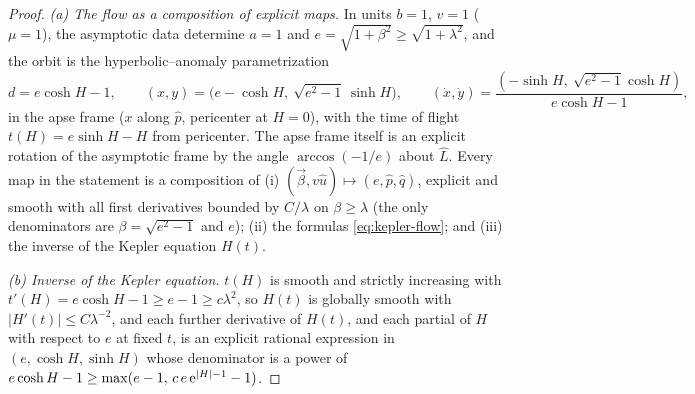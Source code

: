 \documentclass[11pt]{article}
\begin{document}
\begin{proof}
\emph{(a) The flow as a composition of explicit maps.} In units $b=1$, $v=1$ ($\mu=1$), the
asymptotic data determine $a=1$ and $e=\sqrt{1+\beta^2}\ge\sqrt{1+\lambda^2}$, and the orbit is
the hyperbolic--anomaly parametrization
\begin{equation}
  d=e\cosh H-1,\qquad
  (x,y)=\big(e-\cosh H,\ \sqrt{e^2-1}\,\sinh H\big),\qquad
  (\dot x,\dot y)=\frac{(-\sinh H,\ \sqrt{e^2-1}\cosh H)}{e\cosh H-1},
  \label{eq:kepler-flow}
\end{equation}
in the apse frame ($x$ along $\hat p$, pericenter at $H=0$), with the time of flight
$t(H)=e\sinh H-H$ from pericenter. The apse frame itself is an explicit rotation of the asymptotic
frame by the angle $\arccos(-1/e)$ about $\hat L$. Every map in the statement is a composition of
(i) $(\vec\beta,v\hat u)\mapsto(e,\hat p,\hat q)$, explicit and smooth with all first derivatives
bounded by $C/\lambda$ on $\beta\ge\lambda$ (the only denominators are $\beta=\sqrt{e^2-1}$ and
$e$); (ii) the formulas \eqref{eq:kepler-flow}; and (iii) the inverse of the Kepler equation
$H(t)$.

\emph{(b) Inverse of the Kepler equation.} $t(H)$ is smooth and strictly increasing with
$t'(H)=e\cosh H-1\ge e-1\ge c\lambda^2$, so $H(t)$ is globally smooth with $|H'(t)|\le C\lambda^{-2}$,
and each further derivative of $H(t)$, and each partial of $H$ with respect to $e$ at fixed $t$, is
an explicit rational expression in $(e,\cosh H,\sinh H)$ whose denominator is a power of
$e\cosh H-1\ge\max(e-1,\,c\,e\,{\rm e}^{|H|-1}-1)$.


\end{proof}
\end{document}
